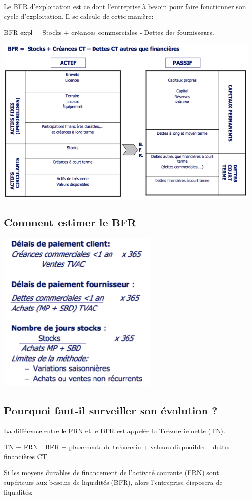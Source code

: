 \documentclass{article}
\begin{document}
Le BFR d'exploitation est ce dont l'entreprise à besoin pour faire fonctionner son cycle d'exploitation. Il se calcule de cette manière:

\begin{center}
	BFR expl = Stocks + créances commerciales - Dettes des fournisseurs.
\end{center}

\includegraphics[width=15cm]{c2.png}

\subsection{Comment estimer le BFR}

\includegraphics[width=8cm]{c5.png}

\subsection{Pourquoi faut-il surveiller son évolution ?}
La différence entre le FRN et le BFR est appelée la Trésorerie nette (TN).
\begin{center}
	TN = FRN - BFR = placements de trésorerie + valeurs disponibles - dettes financières CT
\end{center}
Si les moyens durables de financement de l'activité courante (FRN) sont supérieurs aux besoins de liquidités (BFR), alors l'entreprise disposera de liquidités:
\end{document}
